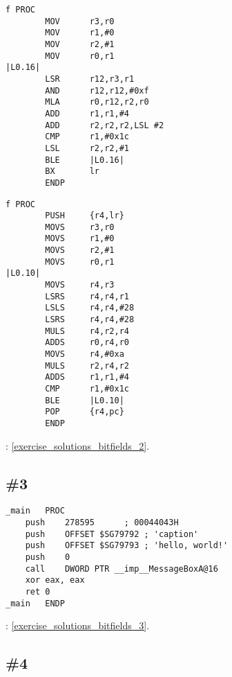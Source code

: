 \begin{lstlisting}[caption=\Optimizing{} Keil 5.03 (\ARMMode)]
f PROC
        MOV      r3,r0
        MOV      r1,#0
        MOV      r2,#1
        MOV      r0,r1
|L0.16|
        LSR      r12,r3,r1
        AND      r12,r12,#0xf
        MLA      r0,r12,r2,r0
        ADD      r1,r1,#4
        ADD      r2,r2,r2,LSL #2
        CMP      r1,#0x1c
        LSL      r2,r2,#1
        BLE      |L0.16|
        BX       lr
        ENDP
\end{lstlisting}

\begin{lstlisting}[caption=\Optimizing{} Keil 5.03 (\ThumbMode)]
f PROC
        PUSH     {r4,lr}
        MOVS     r3,r0
        MOVS     r1,#0
        MOVS     r2,#1
        MOVS     r0,r1
|L0.10|
        MOVS     r4,r3
        LSRS     r4,r4,r1
        LSLS     r4,r4,#28
        LSRS     r4,r4,#28
        MULS     r4,r2,r4
        ADDS     r0,r4,r0
        MOVS     r4,#0xa
        MULS     r2,r4,r2
        ADDS     r1,r1,#4
        CMP      r1,#0x1c
        BLE      |L0.10|
        POP      {r4,pc}
        ENDP
\end{lstlisting}

\Answer{}: \ref{exercise_solutions_bitfields_2}.

\subsection{\Exercise \#3}
\label{exercise_bitfields_3}


\begin{lstlisting}[caption=MSVC 2010 /Ox]
_main	PROC
	push	278595		; 00044043H
	push	OFFSET $SG79792 ; 'caption'
	push	OFFSET $SG79793 ; 'hello, world!'
	push	0
	call	DWORD PTR __imp__MessageBoxA@16
	xor	eax, eax
	ret	0
_main	ENDP
\end{lstlisting}

\Answer{}: \ref{exercise_solutions_bitfields_3}.

\subsection{\Exercise \#4}
\label{exercise_bitfields_4}

\WhatThisCodeDoes\

